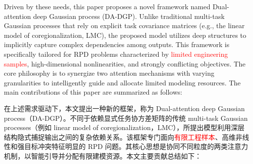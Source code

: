 \documentclass[11pt]{article}
\begin{document}
Driven by these needs, this paper proposes a novel framework named Dual-attention deep Gaussian process (DA-DGP). Unlike traditional multi-task Gaussian processes that rely on explicit task covariance matrices (e.g., the linear model of coregionalization, LMC), the proposed model utilizes deep structures to implicitly capture complex dependencies among outputs. This framework is specifically tailored for RPD problems characterized by \textcolor{red}{limited engineering samples}, high-dimensional nonlinearities, and strongly conflicting objectives. The core philosophy is to synergize two attention mechanisms with varying granularities to intelligently guide and allocate limited modeling resources. The main contributions of this paper are summarized as follows:

在上述需求驱动下，本文提出一种新的框架，称为 Dual-attention deep Gaussian process（DA-DGP）。不同于依赖显式任务协方差矩阵的传统 multi-task Gaussian processes（例如 linear model of coregionalization，LMC），所提出模型利用深层结构隐式捕捉输出之间的复杂依赖关系。该框架专门面向\textcolor{red}{有限工程样本}、高维非线性和强目标冲突特征明显的 RPD 问题。其核心思想是协同不同粒度的两类注意力机制，以智能引导并分配有限建模资源。本文主要贡献总结如下：
\end{document}
